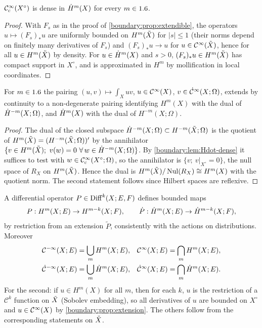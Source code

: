 \begin{lemma}\label{boundary:lem:Hdot-dense}
$\mathcal{C}^\infty_{\mathrm{c}}(X^\circ)$ is dense in $\dot{H}^{m}(X)$ for every $m\in1.6$.
\end{lemma}
\begin{proof}
With $F_s$ as in the proof of \cref{boundary:prop:extendible}, the operators $u\mapsto
(F_s)_*u$ are uniformly bounded on $H^m(\tilde{X})$ for $|s|\le1$ (their norms depend on
finitely many derivatives of $F_s$) and $(F_s)_*u\to u$ for $u\in\mathcal{C}^\infty(\tilde{X})$, hence for
all $u\in H^m(\tilde{X})$ by density. For $u\in\dot{H}^{m}(X)$ and $s>0$, $(F_s)_*u\in
H^m(\tilde{X})$ has compact support in $X^\circ$, and is approximated in $H^m$ by
mollification in local coordinates.
\end{proof}

\begin{proposition}\label{boundary:prop:duality}
For $m\in1.6$ the pairing $(u,v)\mapsto\int_Xuv$, $u\in\mathcal{C}^\infty(X)$, $v\in\dot{\mathcal{C}}^\infty(X;\Omega)$,
extends by continuity to a non-degenerate pairing identifying $H^m(X)$ with the dual
of $\dot{H}^{-m}(X;\Omega)$, and $\dot{H}^{m}(X)$ with the dual of $H^{-m}(X;\Omega)$.
\end{proposition}
\begin{proof}
The dual of the closed subspace $\dot{H}^{-m}(X;\Omega)\subset H^{-m}(\tilde{X};\Omega)$ is the
quotient of $H^m(\tilde{X})=(H^{-m}(\tilde{X};\Omega))'$ by the annihilator $\{v\in H^m(\tilde{X});\
v(w)=0\ \forall\,w\in\dot{H}^{-m}(X;\Omega)\}$. By \cref{boundary:lem:Hdot-dense} it
suffices to test with $w\in\mathcal{C}^\infty_{\mathrm{c}}(X^\circ;\Omega)$, so the annihilator is $\{v;\
v|_{X^\circ}=0\}$, the null space of $R_X$ on $H^m(\tilde{X})$. Hence the dual is
$H^m(\tilde{X})/\operatorname{Nul}(R_X)\cong H^m(X)$ with the quotient norm. The second statement follows
since Hilbert spaces are reflexive.
\end{proof}

A differential operator $P\in\operatorname{Diff}^{k}(X;E,F)$ defines bounded maps
\begin{equation*}
P:H^m(X;E)\to H^{m-k}(X;F),\qquad \dot P:\dot{H}^{m}(X;E)\to\dot{H}^{m-k}(X;F),
\end{equation*}
by restriction from an extension $\tilde P$, consistently with the actions on
distributions. Moreover
\begin{align*}
\mathcal{C}^{-\infty}(X;E)&=\bigcup_mH^m(X;E),& \mathcal{C}^\infty(X;E)&=\bigcap_mH^m(X;E),\\
\dot{\mathcal{C}}^{-\infty}(X;E)&=\bigcup_m\dot{H}^{m}(X;E),& \dot{\mathcal{C}}^\infty(X;E)&=\bigcap_m\dot{H}^{m}(X;E).
\end{align*}
For the second: if $u\in H^m(X)$ for all $m$, then for each $k$, $u$ is the
restriction of a $\mathcal{C}^k$ function on $\tilde{X}$ (Sobolev embedding), so all
derivatives of $u$ are bounded on $X^\circ$ and $u\in\mathcal{C}^\infty(X)$ by
\cref{boundary:prop:extension}. The others follow from the corresponding statements
on $\tilde{X}$.

